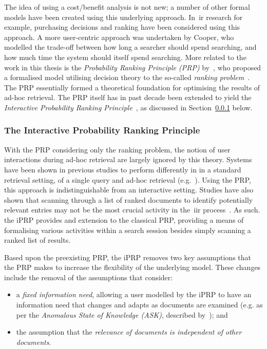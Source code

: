 The idea of using a cost/benefit analysis is not new; a number of other formal models have been created using this underlying approach. In~\gls{ir} research for example, purchasing decisions and ranking have been considered using this approach. A more user-centric approach was undertaken by Cooper, who modelled the trade-off between how long a searcher should spend searching, and how much time the system should itself spend searching. More related to the work in this thesis is the \emph{Probability Ranking Principle (PRP)} by~\citeauthor{robertson1977prp}, who proposed a formalised model utilising decision theory to the so-called \emph{ranking problem}~\citep{robertson1977prp}. The PRP essentially formed a theoretical foundation for optimising the results of ad-hoc retrieval. The PRP itself has in past decade been extended to yield the \emph{Interactive Probability Ranking Principle}~\citep{fuhr2008iprp}, as discussed in Section~\ref{sec:stopping:theories:iprp} below.

\subsubsection{The Interactive Probability Ranking Principle}\label{sec:stopping:theories:iprp}
With the PRP considering only the ranking problem, the notion of user interactions during ad-hoc retrieval are largely ignored by this theory. Systems have been shown in previous studies to perform differently in in a standard retrieval setting, of a single query and ad-hoc retrieval (e.g.~\cite{voorhees2000trec8, turpin2006performance_versus_measures}). Using the PRP, this approach is indistinguishable from an interactive setting. Studies have also shown that scanning through a list of ranked documents to identify potentially relevant entries may not be the most crucial activity in the~\gls{iir} process~\citep{turpin2001batch_evaluations}. As such. the iPRP provides and extension to the classical PRP, providing a means of formalising various activities within a search session besides simply scanning a ranked list of results.

Based upon the preexisting PRP, the iPRP removes two key assumptions that the PRP makes to increase the flexibility of the underlying model. These changes include the removal of the assumptions that consider:

\begin{itemize}
    \item{a \emph{fixed information need}, allowing a user modelled by the iPRP to have an information need that changes and adapts as documents are examined (e.g. as per the \emph{Anomalous State of Knowledge (ASK)}, described by~\citeauthor{belkin1980ask}); and}
    \item{the assumption that the \emph{relevance of documents is independent of other documents}.}
\end{itemize}

